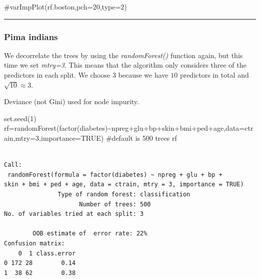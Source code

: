 \documentclass[
  letterpaper,
  DIV=11,
  numbers=noendperiod]{scrartcl}
\newenvironment{Shaded}{\begin{snugshade}}{\end{snugshade}}
\newcommand{\AttributeTok}[1]{\textcolor[rgb]{0.40,0.45,0.13}{#1}}
\newcommand{\CommentTok}[1]{\textcolor[rgb]{0.37,0.37,0.37}{#1}}
\newcommand{\ConstantTok}[1]{\textcolor[rgb]{0.56,0.35,0.01}{#1}}
\newcommand{\DecValTok}[1]{\textcolor[rgb]{0.68,0.00,0.00}{#1}}
\newcommand{\FunctionTok}[1]{\textcolor[rgb]{0.28,0.35,0.67}{#1}}
\newcommand{\NormalTok}[1]{\textcolor[rgb]{0.00,0.23,0.31}{#1}}
\newcommand{\OtherTok}[1]{\textcolor[rgb]{0.00,0.23,0.31}{#1}}
\newcommand{\SpecialCharTok}[1]{\textcolor[rgb]{0.37,0.37,0.37}{#1}}
\begin{document}
\begin{Shaded}
\begin{Highlighting}[]
\CommentTok{\#varImpPlot(rf.boston,pch=20,type=2)}
\end{Highlighting}
\end{Shaded}

\begin{center}\rule{0.5\linewidth}{0.5pt}\end{center}

\hypertarget{pima-indians-1}{%
\subsubsection{Pima indians}\label{pima-indians-1}}

We decorrelate the trees by using the \emph{randomForest()} function
again, but this time we set \emph{mtry=3}. This means that the algorithm
only considers three of the predictors in each split. We choose \(3\)
because we have \(10\) predictors in total and \(\sqrt{10}\approx 3\).

Deviance (not Gini) used for node impurity.

\begin{Shaded}
\begin{Highlighting}[]
\FunctionTok{set.seed}\NormalTok{(}\DecValTok{1}\NormalTok{)}
\NormalTok{rf}\OtherTok{=}\FunctionTok{randomForest}\NormalTok{(}\FunctionTok{factor}\NormalTok{(diabetes)}\SpecialCharTok{\textasciitilde{}}\NormalTok{npreg}\SpecialCharTok{+}\NormalTok{glu}\SpecialCharTok{+}\NormalTok{bp}\SpecialCharTok{+}\NormalTok{skin}\SpecialCharTok{+}\NormalTok{bmi}\SpecialCharTok{+}\NormalTok{ped}\SpecialCharTok{+}\NormalTok{age,}\AttributeTok{data=}\NormalTok{ctrain,}\AttributeTok{mtry=}\DecValTok{3}\NormalTok{,}\AttributeTok{importance=}\ConstantTok{TRUE}\NormalTok{) }\CommentTok{\#default is 500 trees}
\NormalTok{rf}
\end{Highlighting}
\end{Shaded}

\begin{verbatim}

Call:
 randomForest(formula = factor(diabetes) ~ npreg + glu + bp +      skin + bmi + ped + age, data = ctrain, mtry = 3, importance = TRUE) 
               Type of random forest: classification
                     Number of trees: 500
No. of variables tried at each split: 3

        OOB estimate of  error rate: 22%
Confusion matrix:
    0  1 class.error
0 172 28        0.14
1  38 62        0.38
\end{verbatim}
\end{document}
